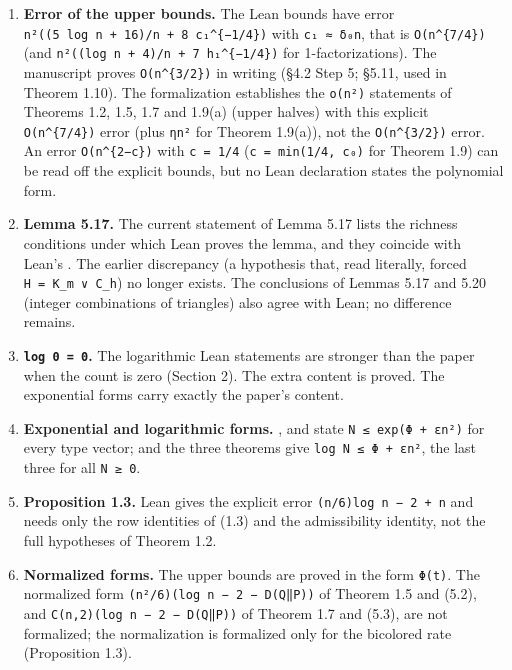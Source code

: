 \documentclass[english,11pt,a4paper]{article}
\providecommand{\tightlist}{\setlength{\itemsep}{0pt}\setlength{\parskip}{0pt}}
\begin{document}
\begin{enumerate}
\def\labelenumi{\arabic{enumi}.}
\tightlist
\item
  \textbf{Error of the upper bounds.} The Lean bounds have error \texttt{n²((5\ log\ n\ +\ 16)/n\ +\ 8\ c₁\^{}\{−1/4\})} with \texttt{c₁\ ≈\ δ₀n}, that is \texttt{O(n\^{}\{7/4\})} (and \texttt{n²((log\ n\ +\ 4)/n\ +\ 7\ h₁\^{}\{−1/4\})} for 1-factorizations). The manuscript proves \texttt{O(n\^{}\{3/2\})} in writing (§4.2 Step 5; §5.11, used in Theorem 1.10). The formalization establishes the \texttt{o(n²)} statements of Theorems 1.2, 1.5, 1.7 and 1.9(a) (upper halves) with this explicit \texttt{O(n\^{}\{7/4\})} error (plus \texttt{ηn²} for Theorem 1.9(a)), not the \texttt{O(n\^{}\{3/2\})} error. An error \texttt{O(n\^{}\{2−c\})} with \texttt{c\ =\ 1/4} (\texttt{c\ =\ min(1/4,\ c₀)} for Theorem 1.9) can be read off the explicit bounds, but no Lean declaration states the polynomial form.
\item
  \textbf{Lemma 5.17.} The current statement of Lemma 5.17 lists the richness conditions under which Lean proves the lemma, and they coincide with Lean's . The earlier discrepancy (a hypothesis that, read literally, forced \texttt{H\ =\ K\_m\ ∨\ C\_h}) no longer exists. The conclusions of Lemmas 5.17 and 5.20 (integer combinations of triangles) also agree with Lean; no difference remains.
\item
  \textbf{\texttt{log\ 0\ =\ 0}.} The logarithmic Lean statements are stronger than the paper when the count is zero (Section 2). The extra content is proved. The exponential forms carry exactly the paper's content.
\item
  \textbf{Exponential and logarithmic forms.} ,  and  state \texttt{N\ ≤\ exp(Φ\ +\ εn²)} for every type vector;  and the three  theorems give \texttt{log\ N\ ≤\ Φ\ +\ εn²}, the last three for all \texttt{N\ ≥\ 0}.
\item
  \textbf{Proposition 1.3.} Lean gives the explicit error \texttt{(n/6)\textbar{}log\ n\ −\ 2\textbar{}\ +\ n} and needs only the row identities of (1.3) and the admissibility identity, not the full hypotheses of Theorem 1.2.
\item
  \textbf{Normalized forms.} The upper bounds are proved in the form \texttt{Φ(t)}. The normalized form \texttt{(n²/6)(log\ n\ −\ 2\ −\ D(Q‖P))} of Theorem 1.5 and (5.2), and \texttt{C(n,2)(log\ n\ −\ 2\ −\ D(Q‖P))} of Theorem 1.7 and (5.3), are not formalized; the normalization is formalized only for the bicolored rate (Proposition 1.3).

\end{enumerate}
\end{document}
